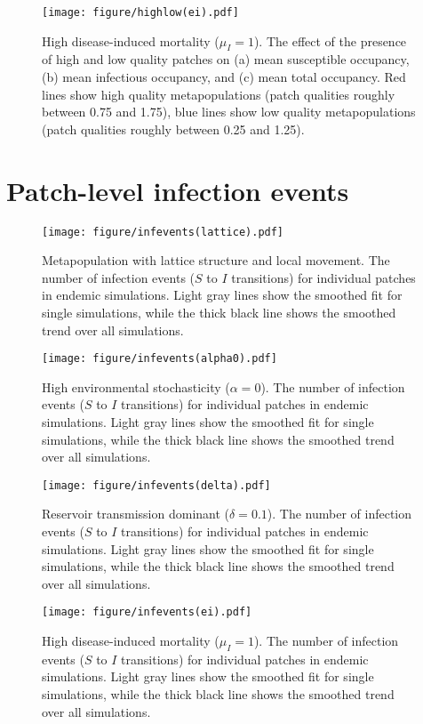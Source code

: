 \documentclass{article}
\begin{document}
\begin{figure}
\centering
\texttt{[image: figure/highlow(ei).pdf]}
\caption{High disease-induced mortality ($\mu_I = 1$).  The effect of the presence of high and low quality patches on (a) mean susceptible occupancy, (b) mean infectious occupancy, and (c) mean total occupancy.  Red lines show high quality metapopulations (patch qualities roughly between 0.75 and 1.75), blue lines show low quality metapopulations (patch qualities roughly between 0.25 and 1.25).}
\label{sens_ei}
\end{figure}

\clearpage

\section{Patch-level infection events}

\begin{figure}[h!]
\centering
\texttt{[image: figure/infevents(lattice).pdf]}
\caption{Metapopulation with lattice structure and local movement.  The number of infection events ($S$ to $I$ transitions) for individual patches in endemic simulations.  Light gray lines show the smoothed fit for single simulations, while the thick black line shows the smoothed trend over all simulations.}
\label{infections_lattice}
\end{figure}

\begin{figure}
\centering
\texttt{[image: figure/infevents(alpha0).pdf]}
\caption{High environmental stochasticity ($\alpha = 0$).  The number of infection events ($S$ to $I$ transitions) for individual patches in endemic simulations.  Light gray lines show the smoothed fit for single simulations, while the thick black line shows the smoothed trend over all simulations.}
\label{infections_x0}
\end{figure}

\begin{figure}
\centering
\texttt{[image: figure/infevents(delta).pdf]}
\caption{Reservoir transmission dominant ($\delta = 0.1$).  The number of infection events ($S$ to $I$ transitions) for individual patches in endemic simulations.  Light gray lines show the smoothed fit for single simulations, while the thick black line shows the smoothed trend over all simulations.}
\label{infections_delta}
\end{figure}

\begin{figure}
\centering
\texttt{[image: figure/infevents(ei).pdf]}
\caption{High disease-induced mortality ($\mu_I = 1$).  The number of infection events ($S$ to $I$ transitions) for individual patches in endemic simulations.  Light gray lines show the smoothed fit for single simulations, while the thick black line shows the smoothed trend over all simulations.}
\label{infections_ei}
\end{figure}
\end{document}
